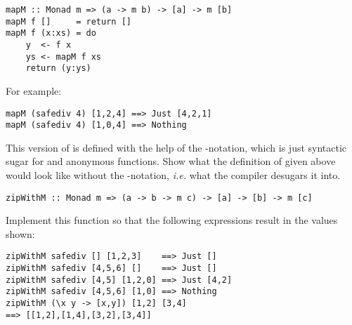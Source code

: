 
\taskLine 

\begin{verbatim}
mapM :: Monad m => (a -> m b) -> [a] -> m [b]
mapM f []     = return [] 
mapM f (x:xs) = do 
    y  <- f x 
    ys <- mapM f xs
    return (y:ys)
\end{verbatim}
For example:
\begin{verbatim}
mapM (safediv 4) [1,2,4] ==> Just [4,2,1]
mapM (safediv 4) [1,0,4] ==> Nothing
\end{verbatim}
This version of  is defined with the help of the -notation, which is just syntactic sugar for \haskellIn{(>>=)} and anonymous functions. Show what the definition of  given above would look like without the -notation, \emph{i.e.} what the compiler desugars it into.


\begin{verbatim}
zipWithM :: Monad m => (a -> b -> m c) -> [a] -> [b] -> m [c]
\end{verbatim}
Implement this function so that the following expressions result in the values shown:
\begin{verbatim}
zipWithM safediv [] [1,2,3]    ==> Just []
zipWithM safediv [4,5,6] []    ==> Just []
zipWithM safediv [4,5] [1,2,0] ==> Just [4,2]
zipWithM safediv [4,5,6] [1,0] ==> Nothing
zipWithM (\x y -> [x,y]) [1,2] [3,4] 
==> [[1,2],[1,4],[3,2],[3,4]]
\end{verbatim}


\taskLine

